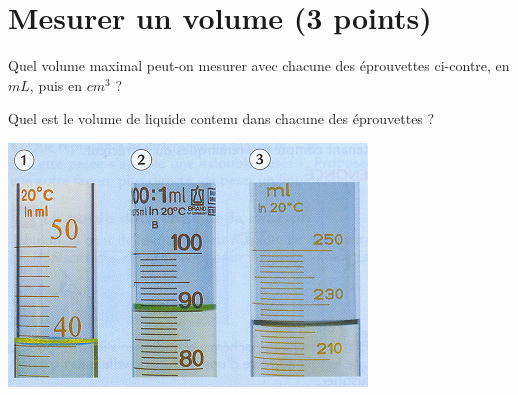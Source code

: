 \section{Mesurer un volume (3 points)}\label{ex:temperture}


\begin{questions}
	
	\begin{multicols}{2}
		
	
		\question[2] Quel volume maximal peut-on mesurer avec chacune des éprouvettes ci-contre, en $mL$, puis en $cm^3$ ?
		
		\question[1]	Quel est le volume de liquide contenu dans chacune des éprouvettes ?
		
		\begin{center}
			
		\includegraphics[scale=0.85]{img/mesure1}
		\end{center}
		
	\end{multicols}
	
\end{questions}